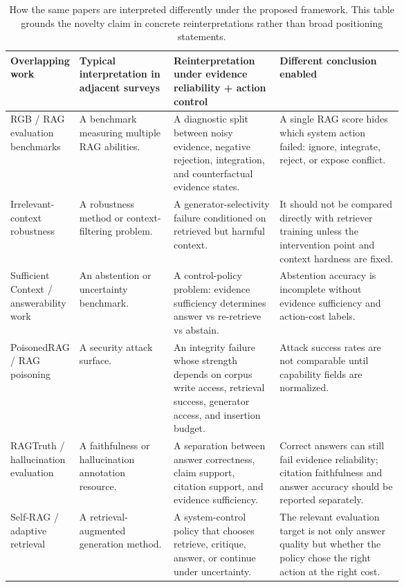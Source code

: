 \documentclass[11pt]{article}
\begin{document}

\begin{table}[t]
\centering
\scriptsize
\renewcommand{\arraystretch}{0.9}
\begin{tabularx}{\linewidth}{>{\raggedright\arraybackslash}p{0.15\linewidth}>{\raggedright\arraybackslash}p{0.24\linewidth}>{\raggedright\arraybackslash}p{0.27\linewidth}X}
\toprule
\textbf{Overlapping work} & \textbf{Typical interpretation in adjacent surveys} & \textbf{Reinterpretation under evidence reliability + action control} & \textbf{Different conclusion enabled} \\
\midrule
RGB / RAG evaluation benchmarks & A benchmark measuring multiple RAG abilities. & A diagnostic split between noisy evidence, negative rejection, integration, and counterfactual evidence states. & A single RAG score hides which system action failed: ignore, integrate, reject, or expose conflict. \\
Irrelevant-context robustness & A robustness method or context-filtering problem. & A generator-selectivity failure conditioned on retrieved but harmful context. & It should not be compared directly with retriever training unless the intervention point and context hardness are fixed. \\
Sufficient Context / answerability work & An abstention or uncertainty benchmark. & A control-policy problem: evidence sufficiency determines answer vs re-retrieve vs abstain. & Abstention accuracy is incomplete without evidence sufficiency and action-cost labels. \\
PoisonedRAG / RAG poisoning & A security attack surface. & An integrity failure whose strength depends on corpus write access, retrieval success, generator access, and insertion budget. & Attack success rates are not comparable until capability fields are normalized. \\
RAGTruth / hallucination evaluation & A faithfulness or hallucination annotation resource. & A separation between answer correctness, claim support, citation support, and evidence sufficiency. & Correct answers can still fail evidence reliability; citation faithfulness and answer accuracy should be reported separately. \\
Self-RAG / adaptive retrieval & A retrieval-augmented generation method. & A system-control policy that chooses retrieve, critique, answer, or continue under uncertainty. & The relevant evaluation target is not only answer quality but whether the policy chose the right action at the right cost. \\
\bottomrule
\end{tabularx}
\caption{How the same papers are interpreted differently under the proposed framework. This table grounds the novelty claim in concrete reinterpretations rather than broad positioning statements.}
\label{tab:overlap-reinterpretation}
\end{table}
\end{document}
